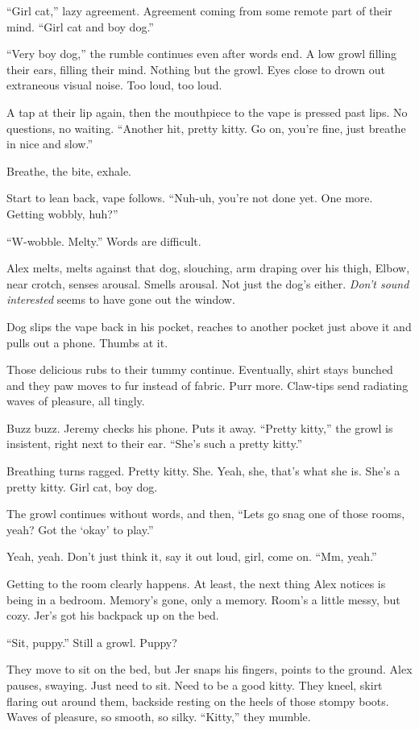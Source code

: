 ``Girl cat,'' lazy agreement. Agreement coming from some remote part of their mind. ``Girl cat and boy dog.''

``Very boy dog,'' the rumble continues even after words end. A low growl filling their ears, filling their mind. Nothing but the growl. Eyes close to drown out extraneous visual noise. Too loud, too loud.

A tap at their lip again, then the mouthpiece to the vape is pressed past lips. No questions, no waiting. ``Another hit, pretty kitty. Go on, you're fine, just breathe in nice and slow.''

Breathe, the bite, exhale.

Start to lean back, vape follows. ``Nuh-uh, you're not done yet. One more. Getting wobbly, huh?''

``W-wobble. Melty.'' Words are difficult.

Alex melts, melts against that dog, slouching, arm draping over his thigh, Elbow, near crotch, senses arousal. Smells arousal. Not just the dog's either. \emph{Don't sound interested} seems to have gone out the window.

Dog slips the vape back in his pocket, reaches to another pocket just above it and pulls out a phone. Thumbs at it.

Those delicious rubs to their tummy continue. Eventually, shirt stays bunched and they paw moves to fur instead of fabric. Purr more. Claw-tips send radiating waves of pleasure, all tingly.

Buzz buzz. Jeremy checks his phone. Puts it away. ``Pretty kitty,'' the growl is insistent, right next to their ear. ``She's such a pretty kitty.''

Breathing turns ragged. Pretty kitty. She. Yeah, she, that's what she is. She's a pretty kitty. Girl cat, boy dog.

The growl continues without words, and then, ``Lets go snag one of those rooms, yeah? Got the `okay' to play.''

Yeah, yeah. Don't just think it, say it out loud, girl, come on. ``Mm, yeah.''

Getting to the room clearly happens. At least, the next thing Alex notices is being in a bedroom. Memory's gone, only a memory. Room's a little messy, but cozy. Jer's got his backpack up on the bed.

``Sit, puppy.'' Still a growl. Puppy?

They move to sit on the bed, but Jer snaps his fingers, points to the ground. Alex pauses, swaying. Just need to sit. Need to be a good kitty. They kneel, skirt flaring out around them, backside resting on the heels of those stompy boots. Waves of pleasure, so smooth, so silky. ``Kitty,'' they mumble.

